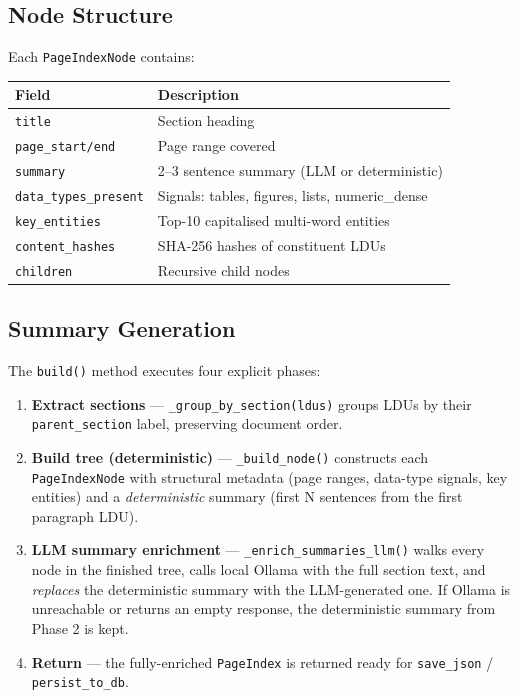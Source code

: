 \documentclass[12pt,a4paper]{article}
\begin{document}
\subsection{Node Structure}

Each \texttt{PageIndexNode} contains:

\begin{center}
\begin{tabular}{lp{9cm}}
\toprule
\textbf{Field} & \textbf{Description} \\
\midrule
\texttt{title}              & Section heading \\
\texttt{page\_start/end}    & Page range covered \\
\texttt{summary}            & 2--3 sentence summary (LLM or deterministic) \\
\texttt{data\_types\_present} & Signals: tables, figures, lists, numeric\_dense \\
\texttt{key\_entities}      & Top-10 capitalised multi-word entities \\
\texttt{content\_hashes}    & SHA-256 hashes of constituent LDUs \\
\texttt{children}           & Recursive child nodes \\
\bottomrule
\end{tabular}
\end{center}

\subsection{Summary Generation}

The \texttt{build()} method executes four explicit phases:

\begin{enumerate}[nosep]
    \item \textbf{Extract sections} — \texttt{\_group\_by\_section(ldus)} groups LDUs
          by their \texttt{parent\_section} label, preserving document order.
    \item \textbf{Build tree (deterministic)} — \texttt{\_build\_node()} constructs
          each \texttt{PageIndexNode} with structural metadata (page ranges,
          data-type signals, key entities) and a \emph{deterministic} summary
          (first N sentences from the first paragraph LDU).
    \item \textbf{LLM summary enrichment} — \texttt{\_enrich\_summaries\_llm()}
          walks every node in the finished tree, calls local Ollama with the
          full section text, and \emph{replaces} the deterministic summary with
          the LLM-generated one.  If Ollama is unreachable or returns an empty
          response, the deterministic summary from Phase 2 is kept.
    \item \textbf{Return} — the fully-enriched \texttt{PageIndex} is returned
          ready for \texttt{save\_json} / \texttt{persist\_to\_db}.
\end{enumerate}
\end{document}
